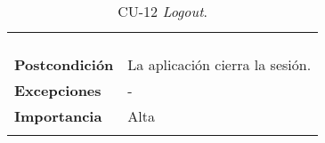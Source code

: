 \begin{longtable}[H]{@{}ll@{}}
\begin{minipage}[t]{0.71\columnwidth}
\begin{enumerate}
\end{enumerate}\strut
\end{minipage}\tabularnewline
\begin{minipage}[t]{0.23\columnwidth}\raggedright\strut
\textbf{Postcondición}\strut
\end{minipage} & \begin{minipage}[t]{0.71\columnwidth}\raggedright\strut
La aplicación cierra la sesión.
\end{minipage}\tabularnewline
\begin{minipage}[t]{0.23\columnwidth}\raggedright\strut
\textbf{Excepciones}\strut
\end{minipage} & \begin{minipage}[t]{0.71\columnwidth}\raggedright\strut
-\strut
\end{minipage}\tabularnewline
\begin{minipage}[t]{0.23\columnwidth}\raggedright\strut
\textbf{Importancia}\strut
\end{minipage} & \begin{minipage}[t]{0.71\columnwidth}\raggedright\strut
Alta\strut
\end{minipage}\tabularnewline
\bottomrule
\caption{CU-12 \emph{Logout}.}
\end{longtable}

\newpage


